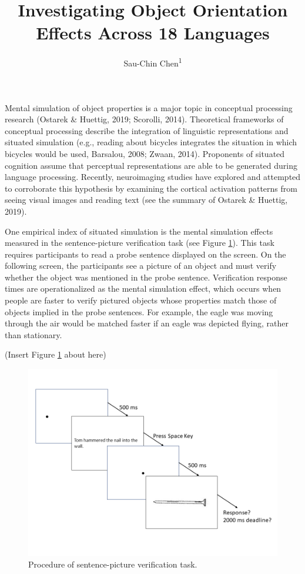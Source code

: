 \documentclass[
  man]{apa7}
\title{Investigating Object Orientation Effects Across 18 Languages}
\author{Sau-Chin Chen\textsuperscript{1}}
\date{}
\affiliation{\vspace{0.5cm}\textsuperscript{1} Department of Human Development and Psychology, Tzu-Chi University, Hualien, Taiwan}
\begin{document}
\maketitle

Mental simulation of object properties is a major topic in conceptual processing research (Ostarek \& Huettig, 2019; Scorolli, 2014). Theoretical frameworks of conceptual processing describe the integration of linguistic representations and situated simulation (e.g., reading about bicycles integrates the situation in which bicycles would be used, Barsalou, 2008; Zwaan, 2014). Proponents of situated cognition assume that perceptual representations are able to be generated during language processing. Recently, neuroimaging studies have explored and attempted to corroborate this hypothesis by examining the cortical activation patterns from seeing visual images and reading text (see the summary of Ostarek \& Huettig, 2019).

One empirical index of situated simulation is the mental simulation effects measured in the sentence-picture verification task (see Figure \ref{fig:fig01}). This task requires participants to read a probe sentence displayed on the screen. On the following screen, the participants see a picture of an object and must verify whether the object was mentioned in the probe sentence. Verification response times are operationalized as the mental simulation effect, which occurs when people are faster to verify pictured objects whose properties match those of objects implied in the probe sentences. For example, the eagle was moving through the air would be matched faster if an eagle was depicted flying, rather than stationary.

(Insert Figure \ref{fig:fig01} about here)

\begin{figure}
\centering
\includegraphics{./includes/fig/fig2a.png}
\caption{\label{fig:fig01}Procedure of sentence-picture verification task.}
\end{figure}
\end{document}
